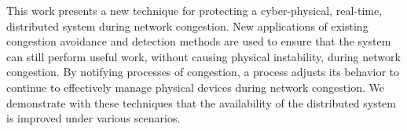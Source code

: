 
This work presents a new technique for protecting a cyber-physical, real-time, distributed system during network congestion. 
New applications of existing congestion avoidance and detection methods are used to ensure that the system can still perform useful work, without causing physical instability, during network congestion.
By notifying processes of congestion, a process adjusts its behavior to continue to effectively manage physical devices during network congestion.
We demonstrate with these techniques that the availability of the distributed system is improved under various scenarios.
